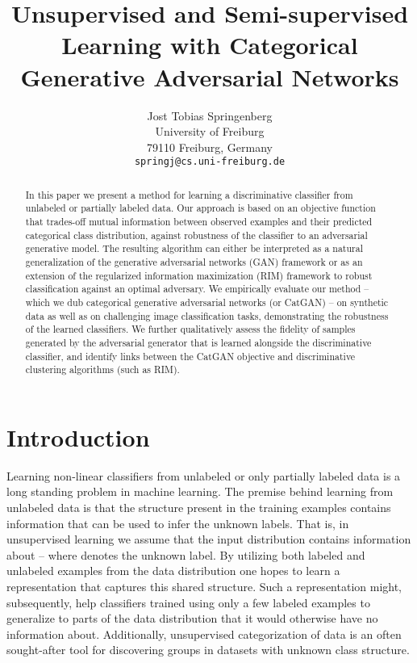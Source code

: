 \documentclass{article} \usepackage{iclr2016_conference,times}
\title{Unsupervised and Semi-supervised Learning with Categorical Generative Adversarial Networks}
\author{Jost Tobias Springenberg \\
University of Freiburg \\
79110 Freiburg, Germany\\
\texttt{springj@cs.uni-freiburg.de} \\
}
\begin{document}
\maketitle

\begin{abstract}
  In this paper we present a method for learning a discriminative
  classifier from unlabeled or partially labeled data.  Our approach
  is based on an objective function that trades-off mutual
  information between observed examples and their predicted
  categorical class distribution, against robustness of the classifier
  to an adversarial generative model. The resulting algorithm can
  either be interpreted as a natural generalization of the generative
  adversarial networks (GAN) framework or as an extension of the
  regularized information maximization (RIM) framework to robust
  classification against an optimal adversary.  We empirically
  evaluate our method -- which we dub categorical generative
  adversarial networks (or CatGAN) -- on synthetic data as well as on
  challenging image classification tasks, demonstrating the robustness
  of the learned classifiers.  We further qualitatively assess the
  fidelity of samples generated by the adversarial generator that is
  learned alongside the discriminative classifier, and identify links
  between the CatGAN objective and discriminative clustering
  algorithms (such as RIM).
\end{abstract}

\section{Introduction}
Learning non-linear classifiers from unlabeled or only partially
labeled data is a long standing problem in machine learning. The
premise behind learning from unlabeled data is that the structure
present in the training examples contains information that can be used
to infer the unknown labels. That is, in unsupervised learning we
assume that the input distribution  contains information about
 -- where  denotes
the unknown label.  By utilizing both labeled and unlabeled examples
from the data distribution one hopes to learn a representation that
captures this shared structure. Such a representation might,
subsequently, help classifiers trained using only a few labeled
examples to generalize to parts of the data distribution that it would
otherwise have no information about. Additionally, unsupervised
categorization of data is an often sought-after tool for discovering
groups in datasets with unknown class structure.
\end{document}

